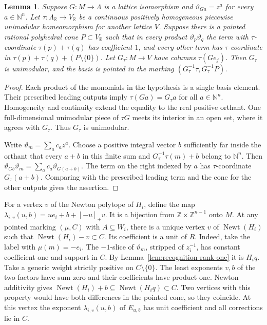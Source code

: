 \documentclass[11pt,reqno]{amsart}
\numberwithin{equation}{section}
\newtheorem{lemma}[theorem]{Lemma}
\theoremstyle{definition}
\theoremstyle{remark}
\DeclareMathOperator{\Newt}{Newt}
\begin{document}
\begin{lemma}\label{lem:straight-contact-pointing}
Suppose \(G:M\longrightarrow\Lambda\) is a lattice isomorphism and
\(\vartheta_{Ga}=z^a\) for every \(a\in\mathbb N^n\). Let
\(\tau:\Lambda_{\mathbb R}\longrightarrow V_{\mathbb R}\) be a continuous
positively homogeneous piecewise unimodular homeomorphism for another
lattice \(V\). Suppose there is a pointed rational polyhedral cone
\(P\subset V_{\mathbb R}\) such that in every product
\(\vartheta_p\vartheta_q\) the term with \(\tau\)-coordinate
\(\tau(p)+\tau(q)\) has coefficient \(1\), and every other term has
\(\tau\)-coordinate in
\(\tau(p)+\tau(q)+(P\setminus\{0\})\).
Let \(G_\tau:M\to V\) have columns \(\tau(Ge_j)\).
Then \(G_\tau\) is unimodular, and the basis is pointed in the marking
\((G_\tau^{-1}\tau,G_\tau^{-1}P)\).
\end{lemma}
\begin{proof}
Each product of the monomials in the hypothesis is a single basis element.
Their prescribed leading outputs imply \(\tau(Ga)=G_\tau a\) for all
\(a\in\mathbb N^n\). Homogeneity and continuity extend the equality
to the real positive orthant. One full-dimensional unimodular piece of
\(\tau G\) meets its interior in an open set, where it agrees with \(G_\tau\).
Thus \(G_\tau\) is unimodular.

Write \(\vartheta_m=\sum_a c_a z^a\). Choose a positive integral vector
\(b\) sufficiently far inside the orthant that every \(a+b\) in this
finite sum and \(G_\tau^{-1}\tau(m)+b\) belong to \(\mathbb N^n\).
Then \(\vartheta_{Gb}\vartheta_m=\sum_a c_a\vartheta_{G(a+b)}\).
The term on the right indexed by \(a\) has \(\tau\)-coordinate
\(G_\tau(a+b)\). Comparing with the prescribed leading term and the
cone for the other outputs gives the assertion.
\end{proof}

For a vertex \(v\) of the Newton polytope of \(H_i\), define the map
\(\lambda_{i,v}(u,b)=u e_i+b+[-u]_+v\).
It is a bijection from \(\mathbb Z\times\mathbb Z^{n-1}\) onto \(M\).
At any pointed marking \((\mu,C)\) with \(A\subseteq W_i\), there is
a unique vertex \(v\) of \(\Newt(H_i)\) such that
\(\Newt(H_i)-v\subset C\). Its coefficient is a unit of \(R\).
Indeed, take the label with \(\mu(m)=-e_i\). The \(-1\)-slice of
\(\vartheta_m\), stripped of \(z_i^{-1}\), has constant coefficient one
and support in \(C\). By Lemma~\ref{lem:recognition-rank-one} it is
\(H_i q\). Take a generic weight strictly positive on \(C\setminus\{0\}\).
The least exponents \(v,b\) of the two factors have sum zero and their
coefficients have product one. Newton additivity gives
\(\Newt(H_i)+b\subseteq\Newt(H_iq)\subset C\).
Two vertices with this property would have both differences in the
pointed cone, so they coincide. At this vertex the exponent
\(\lambda_{i,v}(u,b)\) of \(E_{u,b}\) has unit coefficient and all
corrections lie in \(C\).
\end{document}
